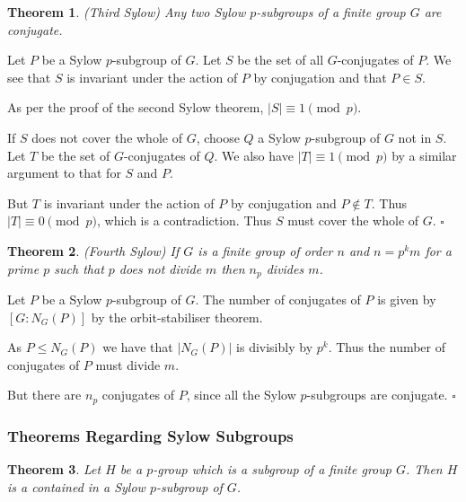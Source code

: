 \documentclass[10pt]{article}
\newtheorem{theorem}{Theorem}[section]
\newenvironment{proof}[1][Proof]{\begin{trivlist}
\item[\hskip \labelsep {\itshape #1}]}{\end{trivlist}}
\begin{document}
\begin{theorem} (Third Sylow)
Any two Sylow $p$-subgroups of a finite group $G$ are conjugate.
\end{theorem}

\begin{proof}
Let $P$ be a Sylow $p$-subgroup of $G$. Let $S$ be the set of all $G$-conjugates of $P$. We see that $S$ is invariant under the action of $P$ by conjugation and that $P \in S$.

As per the proof of the second Sylow theorem, $|S| \equiv 1 \pmod{p}$.

If $S$ does not cover the whole of $G$, choose $Q$ a Sylow $p$-subgroup of $G$ not in $S$. Let $T$ be the set of $G$-conjugates of $Q$. We also have $|T| \equiv 1 \pmod{p}$ by a similar argument to that for $S$ and $P$.

But $T$ is invariant under the action of $P$ by conjugation and $P \notin T$. Thus $|T| \equiv 0 \pmod{p}$, which is a contradiction. Thus $S$ must cover the whole of $G$. $\square$
\end{proof}

\begin{theorem} (Fourth Sylow)
If $G$ is a finite group of order $n$ and $n = p^km$ for a prime $p$ such that $p$ does not divide $m$ then $n_p$ divides $m$.
\end{theorem}

\begin{proof}
Let $P$ be a Sylow $p$-subgroup of $G$. The number of conjugates of $P$ is given by $[G:N_G(P)]$ by the orbit-stabiliser theorem.

As $P \leq N_G(P)$ we have that $|N_G(P)|$ is divisibly by $p^k$. Thus the number of conjugates of $P$ must divide $m$.

But there are $n_p$ conjugates of $P$, since all the Sylow $p$-subgroups are conjugate. $\square$
\end{proof}

\subsubsection{Theorems Regarding Sylow Subgroups}

\begin{theorem}
Let $H$ be a $p$-group which is a subgroup of a finite group $G$. Then $H$ is a contained in a Sylow $p$-subgroup of $G$.
\end{theorem}
\end{document}
